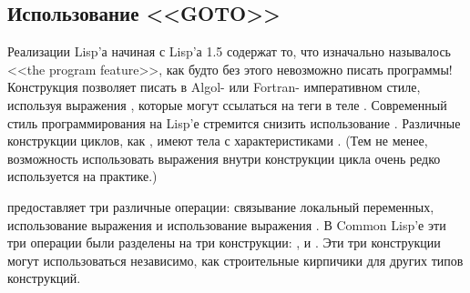 \subsection{Использование <<GOTO>>}

Реализации Lisp'а начиная с Lisp'а 1.5 содержат то, что изначально называлось
<<the program feature>>, как будто без этого невозможно писать программы!
Конструкция  позволяет писать в Algol- или Fortran- императивном
стиле, используя выражения , которые могут ссылаться на теги в теле
. Современный стиль программирования на Lisp'е стремится снизить
использование . Различные конструкции циклов, как , имеют тела
с характеристиками .
(Тем не менее, возможность использовать выражения  внутри конструкции
цикла очень редко используется на практике.)

 предоставляет три различные операции:
связывание локальный переменных,
использование выражения 
и использование выражения .
В Common Lisp'е эти три операции были разделены на три конструкции:
,  и .
Эти три конструкции могут использоваться независимо, как строительные кирпичики
для других типов конструкций.

